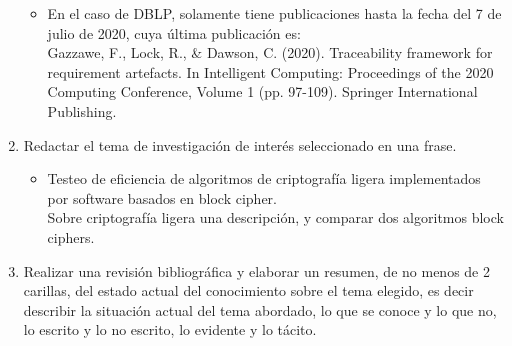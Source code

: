 \documentclass[]{article}
\begin{document}
\begin{enumerate}
\begin{itemize}
		\item En el caso de DBLP, solamente tiene publicaciones hasta la fecha del 7 de julio de 2020, cuya última publicación es: \\
		Gazzawe, F., Lock, R., \& Dawson, C. (2020). Traceability framework for requirement artefacts. In Intelligent Computing: Proceedings of the 2020 Computing Conference, Volume 1 (pp. 97-109). Springer International Publishing.
	\end{itemize}

	\item Redactar el tema de investigación de interés seleccionado en una frase. 
	\begin{itemize}
		\item Testeo de eficiencia de algoritmos de criptografía ligera implementados por software basados en block cipher. \\ Sobre criptografía ligera una descripción, y comparar dos algoritmos block ciphers.	
	\end{itemize}
	
	\item Realizar una revisión bibliográfica y elaborar un resumen, de no menos de 2 carillas, del estado actual del conocimiento sobre el tema elegido, es decir describir la situación actual del tema abordado, lo que se conoce y lo que no, lo escrito y lo no escrito, lo evidente y lo tácito.
\end{enumerate}
\end{document}
